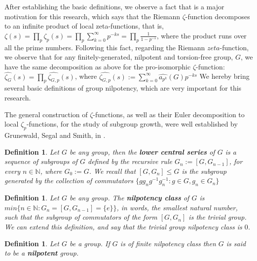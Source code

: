 \documentclass[12pt]{article}
\newtheorem{definition}[theorem]{Definition}
\begin{document}
After establishing the basic definitions, we observe a fact that is a major motivation for this research, which says that the Riemann $\zeta$-function decomposes to an infinite product of local zeta-functions, that is, $\zeta(s)=\prod_p\zeta_p(s)=\prod_p\sum_{k=0}^\infty p^{-ks}=\prod_p\frac{1}{1-p^{-s}}$, where the product runs over all the prime numbers. Following this fact, regarding the Riemann $zeta$-function, we observe that for any finitely-generated, nilpotent and torsion-free group, $G$, we have the same decomposition as above for the pro-isomorphic $\zeta$-function: $\hat{\zeta_G}(s)=\prod_p\hat{\zeta_{G,p}}(s)$, where $\hat{\zeta_{G,p}}(s):=\sum_{k=0}^\infty \hat{a_{p^k}}(G)p^{-ks}$
We hereby bring several basic definitions of group nilpotency, which are very important for this research.\par
The general construction of $\zeta$-functions, as well as their Euler decomposition to local $\zeta_p$-functions, for the study of subgroup growth, were well established by Grunewald, Segal and Smith, in \cite{GrunewaldSegalSmith}.
\begin{definition}
\label{def.lower.central.series}
Let $G$ be any group, then the \textbf{lower central series} of $G$ is a sequence of subgroups of $G$ defined by the recursive rule $G_n:=[G,G_{n-1}]$, for every $n\in\mathbb{N}$, where $G_0:=G$.  We recall that $[G,G_n]\leq G$ is the subgroup generated by the collection of commutators $\{gg_ng^{-1}g_n^{-1} : g\in G,g_n\in G_n\}$
\end{definition}
\begin{definition}
\label{def.nilpotency.class}
Let $G$ be any group. The \textbf{nilpotency class} of $G$ is $min\{n\in\mathbb{N} : G_n=[G,G_{n-1}]=\{e\}\}$, in words, the smallest natural number, such that the subgroup of commutators of the form $[G,G_n]$ is the trivial group. We can extend this definition, and say that the trivial group nilpotency class is $0$.
\end{definition}
\begin{definition}
\label{def.nilpotency.class}
Let $G$ be a group. If $G$ is of finite nilpotency class then $G$ is said to be a \textbf{nilpotent} group.
\end{definition}
\end{document}

